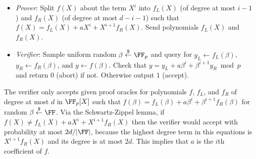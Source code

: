 \begin{itemize}

\item \emph{Prover}: Split $f(X)$ about the term $X^i$ into  $f_L(X)$ (of degree at most $i-1$) and $f_R(X)$ (of degree at most $d-i-1$) such that $f(X) = f_L(X) + a X^i + X^{i+1} f_R(X)$. Send polynomials $f_L(X)$ and $f_R(X)$. 


\item \emph{Verifier}: Sample uniform random  $\beta \sample \FF_p$ and query for $y_L \leftarrow f_L(\beta)$, $y_R \leftarrow f_R(\beta)$, and $y \leftarrow f(\beta)$. 
Check that $y = y_L + a \beta^i + \beta^{i+1} y_R \bmod p$ and return $0$ (abort) if not. Otherwise output $1$ (accept). 



\end{itemize}

The verifier only accepts given proof oracles for polynomials $f$, $f_L$, and $f_R$ of degree at most $d$ in $\FF_p[X]$ such that $f(\beta) = f_L(\beta) + a\beta^i + \beta^{i+1} f_R(\beta)$ for random $\beta \sample \FF$. Via the Schwartz-Zippel lemma, if $f(X) \neq f_L(X) + aX^i + X^{i+1}f_R(X)$ then the verifier would accept with probability at most $2d/|\FF|$, because the highest degree term in this equations is $X^{i+1} f_R(X)$ and its degree is at most $2d$. This implies that $a$ is the $i$th coefficient of $f$. %

